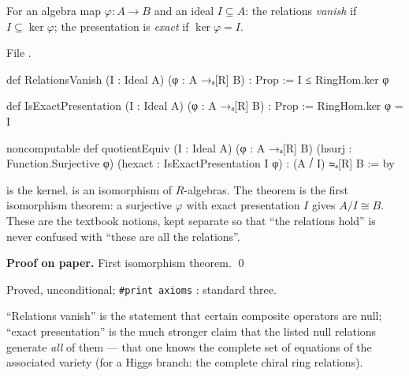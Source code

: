 \begin{definition}\label{l11:def:compres}
For an algebra map $\varphi:A\to B$ and an ideal $I\subseteq A$: the relations \emph{vanish} if
$I\subseteq\ker\varphi$; the presentation is \emph{exact} if $\ker\varphi = I$.
\end{definition}
\noindent File .
\begin{leancode}
def RelationsVanish (I : Ideal A) (φ : A →ₐ[R] B) : Prop :=
  I ≤ RingHom.ker φ

def IsExactPresentation (I : Ideal A) (φ : A →ₐ[R] B) : Prop :=
  RingHom.ker φ = I

noncomputable def quotientEquiv (I : Ideal A) (φ : A →ₐ[R] B)
    (hsurj : Function.Surjective φ) (hexact : IsExactPresentation I φ) :
    (A ⧸ I) ≃ₐ[R] B := by
\end{leancode}

\begin{dictionary}
 is the kernel.  is an isomorphism of $R$-algebras. The theorem
 is the first isomorphism theorem: a surjective $\varphi$ with exact presentation $I$ gives
$A/I\cong B$. These are the textbook notions, kept separate so that ``the relations hold'' is never confused
with ``these are all the relations''.
\end{dictionary}

\textbf{Proof on paper.} First isomorphism theorem. \qed

\begin{status}
Proved, unconditional; \texttt{\#print axioms} \allowbreak{}\allowbreak{}: standard three.
\end{status}

\begin{physics}
``Relations vanish'' is the statement that certain composite operators are null; ``exact presentation'' is the
much stronger claim that the listed null relations generate \emph{all} of them --- that one knows the complete
set of equations of the associated variety (for a Higgs branch: the complete chiral ring relations).
\end{physics}

